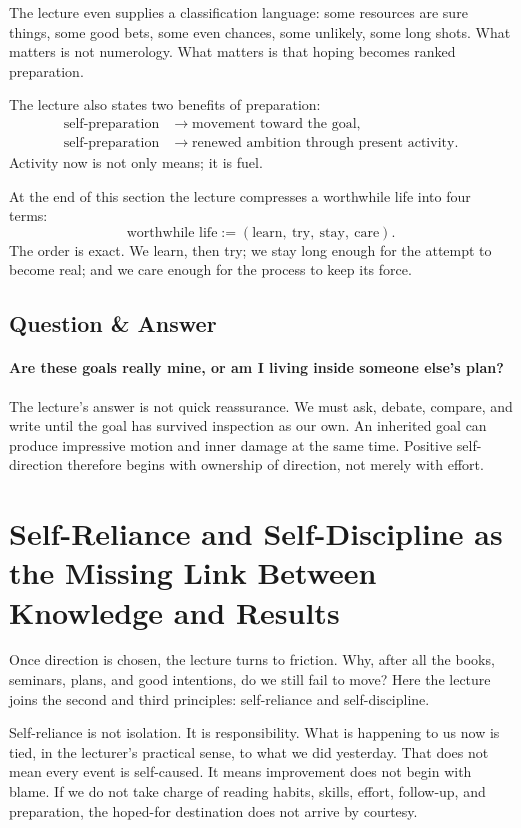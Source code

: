 The lecture even supplies a classification language: some resources are sure things, some good bets, some even chances, some unlikely, some long shots. What matters is not numerology. What matters is that hoping becomes ranked preparation.

The lecture also states two benefits of preparation:
\begin{align}
\text{self-preparation} &\to \text{movement toward the goal},\\
\text{self-preparation} &\to \text{renewed ambition through present activity}.
\end{align}
Activity now is not only means; it is fuel.

At the end of this section the lecture compresses a worthwhile life into four terms:
\begin{equation}
\text{worthwhile life} := (\text{learn},\ \text{try},\ \text{stay},\ \text{care}).
\end{equation}
The order is exact. We learn, then try; we stay long enough for the attempt to become real; and we care enough for the process to keep its force.

\subsection{Question \& Answer}

\paragraph{Are these goals really mine, or am I living inside someone else's plan?}
The lecture's answer is not quick reassurance. We must ask, debate, compare, and write until the goal has survived inspection as our own. An inherited goal can produce impressive motion and inner damage at the same time. Positive self-direction therefore begins with ownership of direction, not merely with effort.

\section{Self-Reliance and Self-Discipline as the Missing Link Between Knowledge and Results}

Once direction is chosen, the lecture turns to friction. Why, after all the books, seminars, plans, and good intentions, do we still fail to move? Here the lecture joins the second and third principles: self-reliance and self-discipline.

Self-reliance is not isolation. It is responsibility. What is happening to us now is tied, in the lecturer's practical sense, to what we did yesterday. That does not mean every event is self-caused. It means improvement does not begin with blame. If we do not take charge of reading habits, skills, effort, follow-up, and preparation, the hoped-for destination does not arrive by courtesy.

